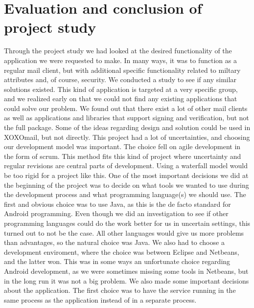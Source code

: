 \pagebreak
\section{Evaluation and conclusion of project study}\label{sec:evalconc}
Through the project study we had looked at the desired functionality of the application we were requested to make. In many ways, it was to function as a regular mail client, but with additional specific functionality related to miltary attributes and, of course, security. We conducted a study to see if any similar solutions existed. This kind of application is targeted at a very specific group, and we realized early on that we could not find any existing applications that could solve our problem. We found out that there exist a lot of other mail clients as well as applications and libraries that support signing and verification, but not the full package. Some of the ideas regarding design and solution could be used in XOXOmail, but not directly.
\newline\newline
This project had a lot of uncertainties, and choosing our development model was important. The choice fell on agile development in the form of scrum. This method fits this kind of project where uncertainty and regular revisions are central parts of development. Using a waterfall model would be too rigid for a project like this.
\newline\newline
One of the most important decisions we did at the beginning of the project was to decide on what tools we wanted to use during the development process and what programming language(s) we should use. The first and obvious choice was to use Java, as this is the de facto standard for Android programming. Even though we did an investigation to see if other programming languages could do the work better for us in uncertain settings, this turned out to not be the case. All other languages would give us more problems than advantages, so the natural choice was Java. We also had to choose a development enviroment, where the choice was between Eclipse and Netbeans, and the latter won.  This was in some ways an unfortunate choice regarding Android development, as we were sometimes missing some tools in Netbeans, but in the long run it was not a big problem.
\newline\newline
We also made some important decisions about the application. The first choice was to have the service running in the same process as the application instead of in a separate process.%
